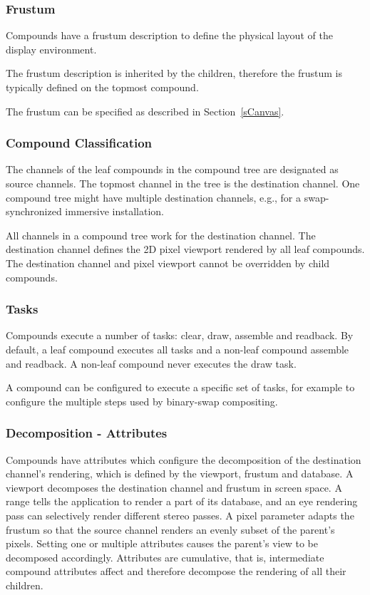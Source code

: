 \documentclass[10pt,a4]{scrartcl}
\newcommand{\sref}[1]{Section~\ref{#1}}
\begin{document}
\subsubsection{\label{sFrustum}Frustum}

Compounds have a frustum description to define the physical layout of
the display environment. 

The frustum description is inherited by the children, therefore the
frustum is typically defined on the topmost compound. 

The frustum can be specified as described in \sref{sCanvas}.

\subsubsection{Compound Classification}
The channels of the leaf compounds in the compound tree are designated
as source channels. The topmost channel in the tree is the destination
channel. One compound tree might have multiple destination channels,
e.g., for a swap-synchronized immersive installation. 

All channels in a compound tree work for the destination channel. The
destination channel defines the 2D pixel viewport rendered by all leaf
compounds. The destination channel and pixel viewport cannot be
overridden by child compounds.

\subsubsection{Tasks}
Compounds execute a number of tasks: clear, draw, assemble and
readback. By default, a leaf compound executes all tasks and a non-leaf
compound assemble and readback. A non-leaf compound never executes the
draw task.

A compound can be configured to execute a specific set of tasks, for
example to configure the multiple steps used by binary-swap compositing.

\subsubsection{Decomposition - Attributes}
Compounds have attributes which configure the decomposition of the
destination channel's rendering, which is defined by the viewport,
frustum and database. A \textsf{viewport} decomposes the destination
channel and frustum in screen space. A \textsf{range} tells the
application to render a part of its database, and an \textsf{eye}
rendering pass can selectively render different stereo passes. A
\textsf{pixel} parameter adapts the frustum so that the source channel
renders an evenly subset of the parent's pixels. Setting one or multiple
attributes causes the parent's view to be decomposed
accordingly. Attributes are cumulative, that is, intermediate compound
attributes affect and therefore decompose the rendering of all their
children.
\end{document}
